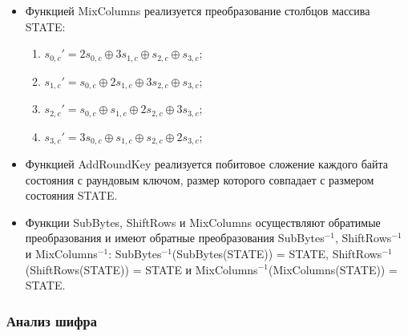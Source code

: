 \documentclass{./civarticle}
\begin{document}
\begin{itemize}
    
    \item Функцией MixColumns реализуется преобразование столбцов массива STATE:

    \begin{enumerate}
        \item $s_{0, c}' = 2s_{0, c} \oplus 3s_{1, c} \oplus s_{2, c} \oplus s_{3, c}$;
        \item $s_{1, c}' = s_{0, c} \oplus 2s_{1, c} \oplus 3s_{2, c} \oplus s_{3, c}$;
        \item $s_{2, c}' = s_{0, c} \oplus s_{1, c} \oplus 2s_{2, c} \oplus 3s_{3, c}$;
        \item $s_{3, c}' = 3s_{0, c} \oplus s_{1, c} \oplus s_{2, c} \oplus 2s_{3, c}$;
    \end{enumerate}


    \begin{figure}[h!]
    \end{figure}
    
    \item Функцией AddRoundKey реализуется побитовое сложение каждого байта состояния с раундовым ключом, размер которого совпадает с размером состояния STATE.

    \item Функции SubBytes, ShiftRows и MixColumns осуществляют обратимые преобразования и имеют обратные преобразования SubBytes$^{-1}$, ShiftRows$^{-1}$ и MixColumns$^{-1}$: SubBytes$^{-1}$(SubBytes(STATE)) = STATE, ShiftRows$^{-1}$(ShiftRows(STATE)) = STATE и MixColumns$^{-1}$(MixColumns(STATE)) = STATE.
\end{itemize}

\subsubsection{Анализ шифра}
\end{document}

